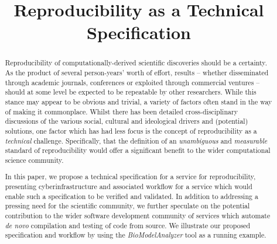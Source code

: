 \documentclass[conference]{IEEEtran}
\begin{document}
%
\title{Reproducibility as a Technical Specification}


\author{
\and
{}
\and
{}
}





\maketitle


\begin{abstract}
Reproducibility of computationally-derived scientific discoveries
should be a certainty. As the product of several person-years' worth
of effort, results -- whether disseminated through academic journals,
conferences or exploited through commercial ventures -- should at some
level be expected to be repeatable by other researchers. While this
stance may appear to be obvious and trivial, a variety of factors
often stand in the way of making it commonplace. Whilst there has been
detailed cross-disciplinary discussions of the various social,
cultural and ideological drivers and (potential) solutions, one factor
which has had less focus is the concept of reproducibility as a
\emph{technical} challenge. Specifically, that the definition of an
\emph{unambiguous} and \emph{measurable} standard of reproducibility
would offer a significant benefit to the wider computational science
community.

In this paper, we propose a technical specification for a service for
reproducibility, presenting cyberinfrastructure and associated
workflow for a service which would enable such a specification to be
verified and validated. In addition to addressing a pressing need for
the scientific community, we further speculate on the potential
contribution to the wider software development community of services
which automate \emph{de novo} compilation and testing of code from
source. We illustrate our proposed specification and workflow by using
the {\emph{BioModelAnalyzer}} tool as a running example.
\end{abstract}
\end{document}
